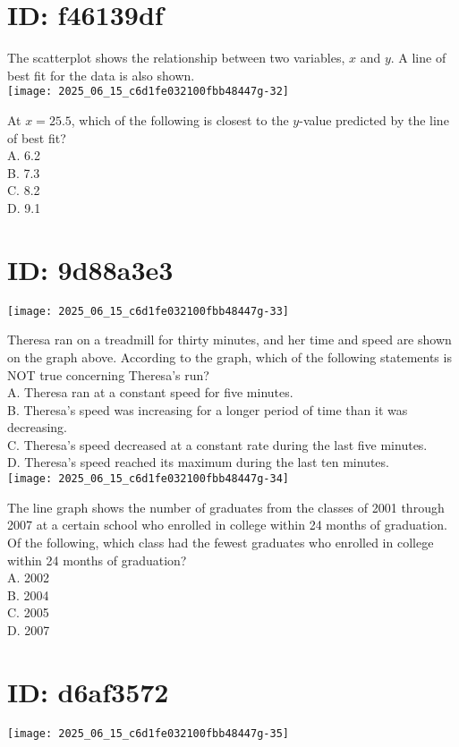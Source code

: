 \section*{ID: f46139df}
The scatterplot shows the relationship between two variables, $x$ and $y$. A line of best fit for the data is also shown.\\
\texttt{[image: 2025\_06\_15\_c6d1fe032100fbb48447g-32]}

At $x=25.5$, which of the following is closest to the $y$-value predicted by the line of best fit?\\
A. 6.2\\
B. 7.3\\
C. 8.2\\
D. 9.1

\section*{ID: 9d88a3e3}
\begin{center}
\texttt{[image: 2025\_06\_15\_c6d1fe032100fbb48447g-33]}
\end{center}

Theresa ran on a treadmill for thirty minutes, and her time and speed are shown on the graph above. According to the graph, which of the following statements is NOT true concerning Theresa's run?\\
A. Theresa ran at a constant speed for five minutes.\\
B. Theresa's speed was increasing for a longer period of time than it was decreasing.\\
C. Theresa's speed decreased at a constant rate during the last five minutes.\\
D. Theresa's speed reached its maximum during the last ten minutes.\\
\texttt{[image: 2025\_06\_15\_c6d1fe032100fbb48447g-34]}

The line graph shows the number of graduates from the classes of 2001 through 2007 at a certain school who enrolled in college within 24 months of graduation. Of the following, which class had the fewest graduates who enrolled in college within 24 months of graduation?\\
A. 2002\\
B. 2004\\
C. 2005\\
D. 2007

\section*{ID: d6af3572}
\begin{center}
\texttt{[image: 2025\_06\_15\_c6d1fe032100fbb48447g-35]}
\end{center}

